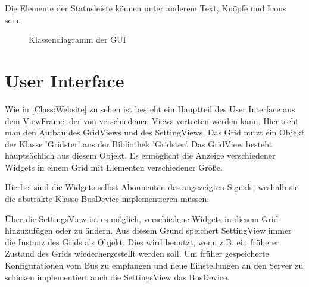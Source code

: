 \documentclass[entwurf.tex]{subfiles}
\begin{document}
		Die Elemente der Statusleiste können unter anderem Text, Knöpfe und Icons sein.
		\begin{figure}[H]
  			\begin{center}
  				\caption{Klassendiagramm der GUI}
  			\end{center}
  		\end{figure}  	
  	
  	\newpage
  	\section{User Interface}
		Wie in \ref{Class:Website} zu sehen ist besteht ein Hauptteil des User Interface aus dem ViewFrame, der von verschiedenen Views vertreten werden kann. Hier sieht man den Aufbau des GridViews und des SettingViews. Das Grid nutzt ein Objekt der Klasse 'Gridster' aus der Bibliothek 'Gridster'. Das GridView besteht hauptsächlich aus diesem Objekt. Es ermöglicht die Anzeige verschiedener Widgets in einem Grid mit Elementen verschiedener Größe.
		
		Hierbei sind die Widgets selbst Abonnenten des angezeigten Signals, weshalb sie die abstrakte Klasse BusDevice implementieren müssen.
		
		Über die SettingsView ist es möglich, verschiedene Widgets in diesem Grid hinzuzufügen oder zu ändern. Aus diesem Grund speichert SettingView immer die Instanz des Grids als Objekt. Dies wird benutzt, wenn z.B. ein früherer Zustand des Grids wiederhergestellt werden soll. Um früher gespeicherte Konfigurationen vom Bus zu empfangen und neue Einstellungen an den Server zu schicken implementiert auch die SettingsView das BusDevice. 
		
\end{document}
